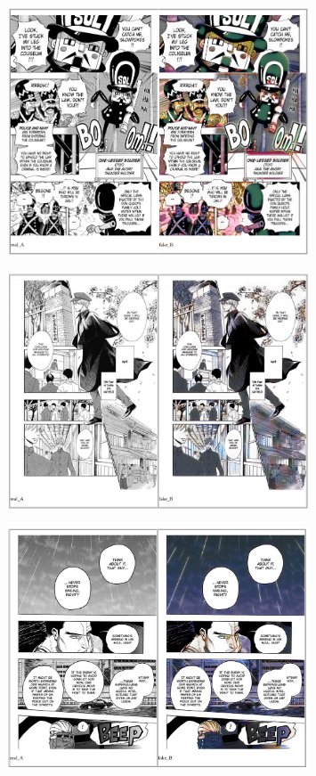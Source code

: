 \begin{figure}[h!]
  \centering
  \includegraphics[width=0.8\textwidth]{chapter/actual/acx.png}
 
  \label{fig:final UI}
\end{figure}
\begin{figure}[h!]
  \centering
  \includegraphics[width=0.8\textwidth]{chapter/actual/acu.png}
  \label{fig:final UI}
\end{figure}
\newpage
\begin{figure}[h!]
  \centering
  \includegraphics[width=0.8\textwidth]{chapter/actual/acy.png}
  \label{fig:final UI}
\end{figure}

